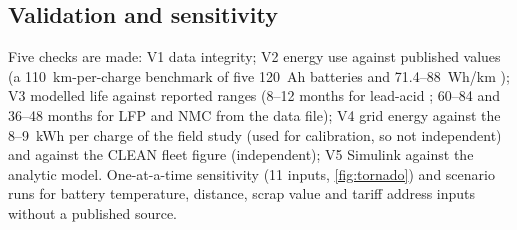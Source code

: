 \subsection{Validation and sensitivity}
Five checks are made: V1 data integrity; V2 energy use against published values (a 110~km-per-charge benchmark of five 120~Ah batteries \citep{techno2016} and 71.4--88~Wh/km \citep{peakdemand}); V3 modelled life against reported ranges (8--12 months for lead-acid \citep{fe2024}; 60--84 and 36--48 months for LFP and NMC from the data file); V4 grid energy against the 8--9~kWh per charge of the field study \citep{chowdhury2026} (used for calibration, so not independent) and against the CLEAN fleet figure (independent); V5 Simulink against the analytic model. One-at-a-time sensitivity (11 inputs, \cref{fig:tornado}) and scenario runs for battery temperature, distance, scrap value and tariff address inputs without a published source.
